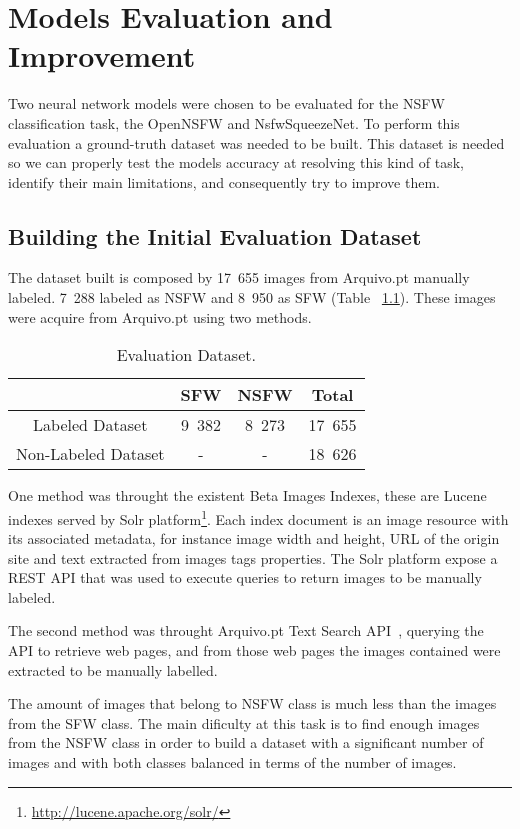 \chapter{Models Evaluation and Improvement}

Two neural network models were chosen to be evaluated for the NSFW classification task, the OpenNSFW and NsfwSqueezeNet. To perform this evaluation a ground-truth dataset was needed to be built. This dataset is needed so we can properly test the models accuracy at resolving this kind of task, identify their main limitations, and consequently try to improve them.

\section{Building the Initial Evaluation Dataset}
\label{sc:eval_dataset}

The dataset built is composed by 17~655 images from Arquivo.pt manually labeled. 7~288 labeled as NSFW and 8~950 as SFW (Table ~\ref{tbl:eval_dataset}). These images were acquire from Arquivo.pt using two methods.

\begin{table}[H]
\centering
\caption{Evaluation Dataset.}
\label{tbl:eval_dataset}
\begin{tabular}{|c|c|c|c|}
\hline
                	& SFW  & NSFW & Total   \\ \hline
Labeled Dataset 	& 9~382 & 8~273 &	17~655    \\ \hline
Non-Labeled Dataset &	-  &  -   & 18~626  \\ \hline
\end{tabular}
\end{table}

One method was throught the existent Beta Images Indexes, these are Lucene indexes served by Solr platform\footnote{\url{http://lucene.apache.org/solr/}}. Each index document is an image resource with its associated metadata, for instance image width and height, URL of the origin site and text extracted from images tags properties. The Solr platform expose a REST API that was used to execute queries to return images to be manually labeled.
 
The second method was throught Arquivo.pt Text Search API~\cite{ftsapi}, querying the API to retrieve web pages, and from those web pages the images contained were extracted to be manually labelled.

The amount of images that belong to NSFW class is much less than the images from the SFW class. The main dificulty at this task is to find enough images from the NSFW class in order to build a dataset with a significant number of images and with both classes balanced in terms of the number of images. 

